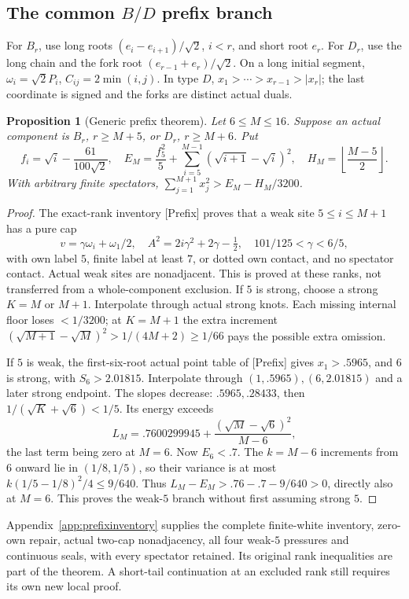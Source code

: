 \documentclass[11pt]{article}
\newtheorem{proposition}[theorem]{Proposition}
\theoremstyle{definition}
\theoremstyle{remark}
\newcommand{\src}[1]{\textnormal{\textsf{[#1]}}}
\begin{document}
\subsection{The common \(B/D\) prefix branch}
For \(B_r\), use long roots \((e_i-e_{i+1})/\sqrt2\), \(i<r\),
and short root \(e_r\). For \(D_r\), use the long chain and the
fork root \((e_{r-1}+e_r)/\sqrt2\). On a long initial segment,
\(\omega_i=\sqrt2P_i\), \(C_{ij}=2\min(i,j)\).
In type \(D\), \(x_1>\cdots>x_{r-1}>|x_r|\); the last
coordinate is signed and the forks are distinct actual duals.
\begin{proposition}[Generic prefix theorem]
\label{prop:prefix}
Let \(6\leq M\leq16\). Suppose an actual component is \(B_r\),
\(r\geq M+5\), or \(D_r\), \(r\geq M+6\). Put
\[
 f_i=\sqrt i-\frac{61}{100\sqrt2},\quad
 E_M=\frac{f_5^2}{5}+\sum_{i=5}^{M-1}(\sqrt{i+1}-\sqrt i)^2,
 \quad H_M=\left\lfloor\frac{M-5}{2}\right\rfloor.
\]
With arbitrary finite spectators,
\(\sum_{j=1}^{M+1}x_j^2>E_M-H_M/3200\).
\end{proposition}
\begin{proof}
The exact-rank inventory \src{Prefix} proves that a weak site
\(5\leq i\leq M+1\) has a pure cap
\[
 v=\gamma\omega_i+\omega_1/2,\quad
 A^2=2i\gamma^2+2\gamma-\tfrac12,\quad
 101/125<\gamma<6/5,
\]
with own label \(5\), finite label at least \(7\), or dotted own
contact, and no spectator contact. Actual weak sites are
nonadjacent. This is proved at these ranks, not transferred from
a whole-component exclusion.
If \(5\) is strong, choose a strong \(K=M\) or \(M+1\).
Interpolate through actual strong knots. Each missing internal
floor loses \(<1/3200\); at \(K=M+1\) the extra increment
\((\sqrt{M+1}-\sqrt M)^2>1/(4M+2)\geq1/66\)
pays the possible extra omission.

If \(5\) is weak, the first-six-root actual point table of
\src{Prefix} gives \(x_1>.5965\), and \(6\) is strong, with
\(S_6>2.01815\). Interpolate through \((1,.5965),(6,2.01815)\)
and a later strong endpoint. The slopes decrease:
\(.5965,.28433\), then \(1/(\sqrt K+\sqrt6)<1/5\).
Its energy exceeds
\[
 L_M=.7600299945+\frac{(\sqrt M-\sqrt6)^2}{M-6},
\]
the last term being zero at \(M=6\).
Now \(E_6<.7\). The \(k=M-6\) increments from \(6\) onward lie
in \((1/8,1/5)\), so their variance is at most
\(k(1/5-1/8)^2/4\leq9/640\).
Thus \(L_M-E_M>.76-.7-9/640>0\), directly also at \(M=6\).
This proves the weak-\(5\) branch without first assuming strong \(5\).
\end{proof}
Appendix~\ref{app:prefixinventory} supplies the complete
finite-white inventory, zero-own repair, actual two-cap
nonadjacency, all four weak-\(5\) pressures and continuous
seals, with every spectator retained. Its original rank
inequalities are part of the theorem. A short-tail continuation
at an excluded rank still requires its own new local proof.
\end{document}
